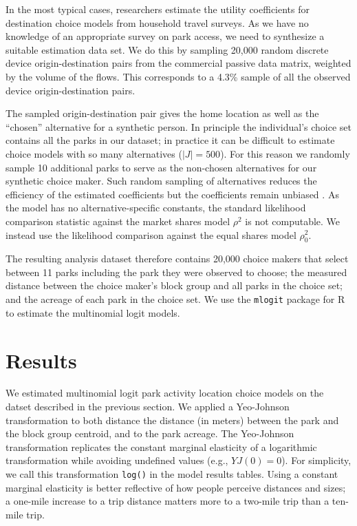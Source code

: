 \documentclass[3p, authoryear, review]{elsarticle} %
\begin{document}
In the most typical cases, researchers estimate the utility coefficients for
destination choice models from household travel surveys. As we have no knowledge
of an appropriate survey on park access, we need to synthesize a suitable
estimation data set. We do this by sampling
20,000 random discrete device origin-destination pairs from the commercial
passive data matrix, weighted by the volume of the flows. This corresponds to a
4.3\% sample of all the observed device
origin-destination pairs.

The sampled origin-destination pair gives the home location as well as the
``chosen'' alternative for a synthetic person. In principle the individual's
choice set contains all the parks in our dataset; in practice it can be
difficult to estimate choice models with so many alternatives
(\(|J| = 500\)). For this reason we randomly sample 10 additional parks
to serve as the non-chosen alternatives for our synthetic choice maker. Such
random sampling of alternatives reduces the efficiency of the estimated
coefficients but the coefficients remain unbiased \citep{train2009}. As the model has
no alternative-specific constants, the standard likelihood comparison statistic
against the market shares model \(\rho^2\) is not computable. We instead use the
likelihood comparison against the equal shares model \(\rho_0^2\).

The resulting analysis dataset therefore contains 20,000 choice makers that
select between 11 parks including the park they were observed to
choose; the measured distance between the choice maker's block group and all
parks in the choice set; and the acreage of each park in the choice set. We use
the \texttt{mlogit} package for R \citep{mlogit, R} to estimate the multinomial logit
models.

\hypertarget{results}{%
\section{Results}\label{results}}

We estimated multinomial logit park activity location choice models on the
datset described in the previous section. We applied a Yeo-Johnson
transformation \citep{Yeo2000} to both distance the distance (in meters) between the
park and the block group centroid, and to the park acreage. The Yeo-Johnson
transformation replicates the constant marginal elasticity of a logarithmic
transformation while avoiding undefined values (e.g., \(YJ(0) = 0\)). For
simplicity, we call this transformation \texttt{log()} in the model results tables.
Using a constant marginal elasticity is better reflective of how people perceive
distances and sizes; a one-mile increase to a trip distance matters more to
a two-mile trip than a ten-mile trip.
\end{document}

